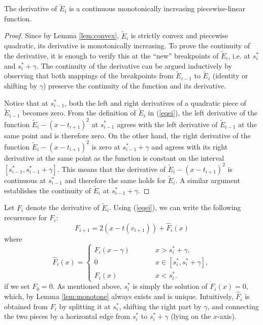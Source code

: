 \documentclass[11pt]{article}
\newcommand{\hF}{\hat{F}}
\begin{document}
\begin{lemma}\label{lem:monotone}
The derivative of $\tilde E_i$ is a continuous monotonically increasing piecewise-linear function. 
\end{lemma}
\begin{proof}Since by Lemma \ref{lem:convex}, $\tilde E_i$ is strictly convex and piecewise quadratic, its derivative  is monotonically increasing. To prove the continuity of the derivative, it is enough to verify this at the ``new'' breakpoints of $\tilde E_i$, i.e. at $s^*_i$ and $s^*_i + \gamma$. The continuity of the derivative can be argued inductively by observing that both mappings of the breakpoints from $\tilde E_{i - 1}$ to $\tilde E_i$ (identity or shifting by $\gamma$) preserve the continuity of the function and its derivative. 

Notice that at $s^*_{i-1}$, both the left and right derivatives of a quadratic piece of $\tilde E_{i-1}$ becomes zero. From the definition of $\tilde E_i$ in (\ref{eqei}), the left derivative of the function $\tilde E_i - (x - t_{i+1})^2$ at $s^*_{i-1}$ agrees with the left derivative of $\tilde E_{i-1}$ at the same point and is therefore zero. On the other hand, the right derivative of the function $\tilde E_i - (x - t_{i+1})^2$ is zero at $s^*_{i-1} + \gamma$ and agrees with its  right derivative at the same point as the function is constant on the interval $[s^*_{i-1}, s^*_{i-1}+\gamma]$. This means that the derivative of $\tilde E_i - (x - t_{i+1})^2$ is continuous at $s^*_{i-1}$ and therefore the same holds for $\tilde E_i$. A similar argument establishes the continuity of $\tilde E_i$ at $s^*_{i-1} + \gamma$.
\end{proof} 

Let $F_i$ denote the derivative of $\tilde E_i$.
Using (\ref{eqei}), we can write the following recurrence for $F_i$:
\begin{equation}\label{eqfi}
F_{i+1} = 2(x-t(v_{i+1})) + \hF_i(x)
\end{equation}
where 
\begin{equation}\label{eq:hatF}
\hF_i(x) = 
\left\{\begin{array}{lll}F_i(x - \gamma) & \qquad & x > s^*_i + \gamma,\\
0 & & x \in [s^*_i, s^*_i + \gamma], \\
F_i(x) && x< s^*_i. \end{array} \right.
\end{equation}
if we set $F_0 = 0$. As mentioned above, $s^*_i$ is simply the solution of $F_i(x) = 0$, which, by Lemma \ref{lem:monotone} always exists and is unique. 
Intuitively, $\hF_i$ is obtained from $F_i$ by splitting it at $s_i^*$, shifting the right part by $\gamma$, and connecting the two pieces by a horizontal edge from $s^*_i$ to $s^*_i + \gamma$ (lying on the $x$-axis).  
\end{document}
